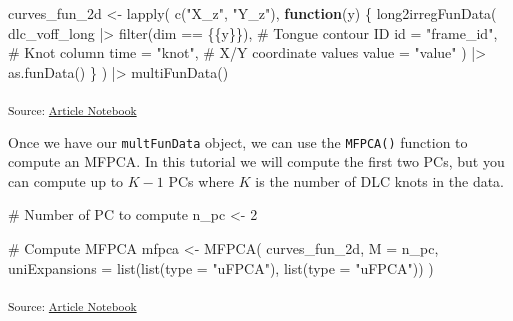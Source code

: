 \documentclass[
]{interact}
\newenvironment{Shaded}{\begin{snugshade}}{\end{snugshade}}
\newcommand{\AttributeTok}[1]{\textcolor[rgb]{0.40,0.45,0.13}{#1}}
\newcommand{\CommentTok}[1]{\textcolor[rgb]{0.37,0.37,0.37}{#1}}
\newcommand{\ControlFlowTok}[1]{\textcolor[rgb]{0.00,0.23,0.31}{\textbf{#1}}}
\newcommand{\DecValTok}[1]{\textcolor[rgb]{0.68,0.00,0.00}{#1}}
\newcommand{\FunctionTok}[1]{\textcolor[rgb]{0.28,0.35,0.67}{#1}}
\newcommand{\NormalTok}[1]{\textcolor[rgb]{0.00,0.23,0.31}{#1}}
\newcommand{\OtherTok}[1]{\textcolor[rgb]{0.00,0.23,0.31}{#1}}
\newcommand{\SpecialCharTok}[1]{\textcolor[rgb]{0.37,0.37,0.37}{#1}}
\newcommand{\StringTok}[1]{\textcolor[rgb]{0.13,0.47,0.30}{#1}}
\begin{document}
\begin{Shaded}
\begin{Highlighting}[]
\NormalTok{curves\_fun\_2d }\OtherTok{\textless{}{-}} \FunctionTok{lapply}\NormalTok{(}
  \FunctionTok{c}\NormalTok{(}\StringTok{"X\_z"}\NormalTok{, }\StringTok{"Y\_z"}\NormalTok{),}
  \ControlFlowTok{function}\NormalTok{(y) \{}
    \FunctionTok{long2irregFunData}\NormalTok{(}
\NormalTok{      dlc\_voff\_long }\SpecialCharTok{|\textgreater{}} \FunctionTok{filter}\NormalTok{(dim }\SpecialCharTok{==}\NormalTok{ \{\{y\}\}),}
      \CommentTok{\# Tongue contour ID}
      \AttributeTok{id =} \StringTok{"frame\_id"}\NormalTok{,}
      \CommentTok{\# Knot column}
      \AttributeTok{time =} \StringTok{"knot"}\NormalTok{,}
      \CommentTok{\# X/Y coordinate values}
      \AttributeTok{value =} \StringTok{"value"}
\NormalTok{    ) }\SpecialCharTok{|\textgreater{}} 
    \FunctionTok{as.funData}\NormalTok{()}
\NormalTok{  \}}
\NormalTok{) }\SpecialCharTok{|\textgreater{}} 
  \FunctionTok{multiFunData}\NormalTok{()}
\end{Highlighting}
\end{Shaded}

\textsubscript{Source:
\href{https://stefanocoretta.github.io/mv_uti/index.qmd.html}{Article
Notebook}}

Once we have our \texttt{multFunData} object, we can use the
\texttt{MFPCA()} function to compute an MFPCA. In this tutorial we will
compute the first two PCs, but you can compute up to \(K-1\) PCs where
\(K\) is the number of DLC knots in the data.

\begin{Shaded}
\begin{Highlighting}[]
\CommentTok{\# Number of PC to compute}
\NormalTok{n\_pc }\OtherTok{\textless{}{-}} \DecValTok{2}

\CommentTok{\# Compute MFPCA}
\NormalTok{mfpca }\OtherTok{\textless{}{-}} \FunctionTok{MFPCA}\NormalTok{(}
\NormalTok{  curves\_fun\_2d,}
  \AttributeTok{M =}\NormalTok{ n\_pc,}
  \AttributeTok{uniExpansions =} \FunctionTok{list}\NormalTok{(}\FunctionTok{list}\NormalTok{(}\AttributeTok{type =} \StringTok{"uFPCA"}\NormalTok{), }\FunctionTok{list}\NormalTok{(}\AttributeTok{type =} \StringTok{"uFPCA"}\NormalTok{))}
\NormalTok{)}
\end{Highlighting}
\end{Shaded}

\textsubscript{Source:
\href{https://stefanocoretta.github.io/mv_uti/index.qmd.html}{Article
Notebook}}
\end{document}
